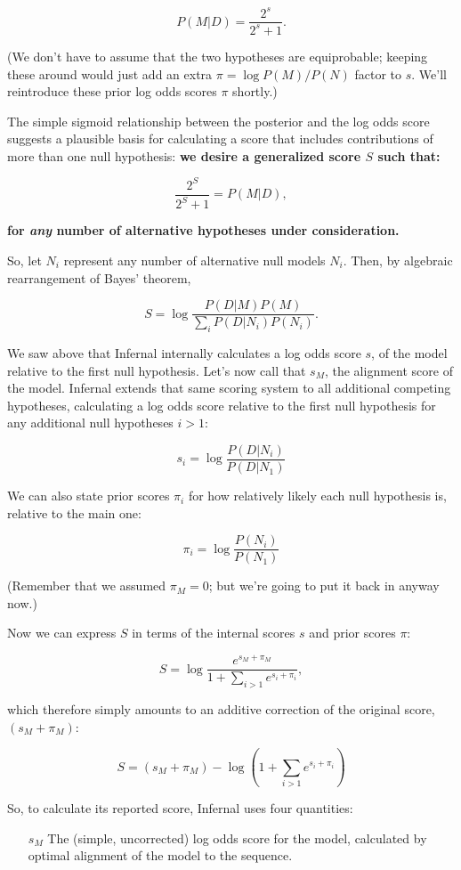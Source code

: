 \begin{sreoutput}
\[
  P(M | D) = \frac{2^s}{2^s + 1}.
\]

(We don't have to assume that the two hypotheses are equiprobable;
keeping these around would just add an extra $\pi = \log P(M) / P(N)$
factor to $s$. We'll reintroduce these prior log odds scores $\pi$
shortly.)

The simple sigmoid relationship between the posterior and the log odds
score suggests a plausible basis for calculating a score that includes
contributions of more than one null hypothesis: \textbf{we desire a
generalized score $S$ such that:}

\[
  \frac{2^S}{2^S + 1} = P(M | D),
\]

\textbf{for \emph{any} number of alternative hypotheses under consideration.}

So, let $N_i$ represent any number of alternative null models
$N_i$. Then, by algebraic rearrangement of Bayes' theorem,

\[
   S = \log \frac{P(D | M) P(M)}{ \sum_{i} P(D | N_i) P(N_i)}. 
\]

We saw above that Infernal internally calculates a log odds score $s$, of
the model relative to the first null hypothesis. Let's now call that
$s_M$, the alignment score of the model. Infernal extends that same
scoring system to all additional competing hypotheses, calculating a
log odds score relative to the first null hypothesis for any
additional null hypotheses $i > 1$:

\[
  s_i = \log \frac{P(D | N_i)}{P(D | N_1)}
\]

We can also state prior scores $\pi_i$ for how relatively likely
each null hypothesis is, relative to the main one:

\[
  \pi_i = \log \frac{P(N_i)}{P(N_1)}
\]

(Remember that we assumed $\pi_M = 0$; but we're going to put it back
in anyway now.)

Now we can express $S$ in terms of the internal scores $s$ and
prior scores $\pi$:

\[
   S = \log  \frac{e^{s_M + \pi_M}} { 1 + \sum_{i>1} e^{s_i + \pi_i}},
\]

which therefore simply amounts to an additive correction of the
original score, $(s_M + \pi_M)$:

\[
  S = (s_M + \pi_M) - \log \left( 1 + \sum_{i>1} e^{s_i + \pi_i} \right)
\]

So, to calculate its reported score, Infernal uses four quantities:

\begin{enumerate}
\item [$s_M$] The (simple, uncorrected) log odds score for the model,
calculated by optimal alignment of the model to the sequence.


\end{enumerate}
\end{sreoutput}
